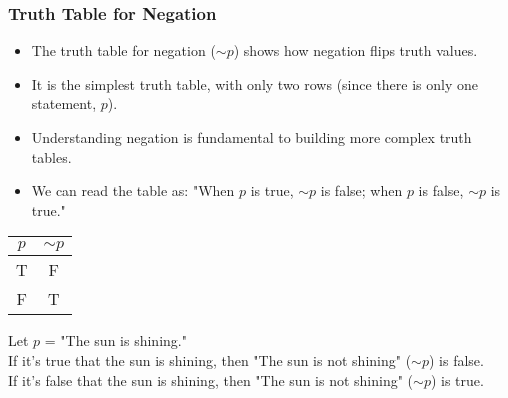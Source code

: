 \documentclass{beamer}
\begin{document}
                \begin{frame}
                \frametitle{Truth Table for Negation}
                \begin{itemize}
                    \item The truth table for negation ($\sim p$) shows how negation flips truth values.
                    \item It is the simplest truth table, with only two rows (since there is only one statement, $p$).
                    \item Understanding negation is fundamental to building more complex truth tables.
                    \item We can read the table as: "When $p$ is true, $\sim p$ is false; when $p$ is false, $\sim p$ is true."
                \end{itemize}
                
                \begin{center}
                \begin{tabular}{|c|c|}
                \hline
                $p$ & $\sim p$ \\
                \hline
                T & F \\
                \hline
                F & T \\
                \hline
                \end{tabular}
                \end{center}
                
                \begin{example}
                    \scriptsize
                Let $p$ = "The sun is shining."\\
                If it's true that the sun is shining, then "The sun is not shining" ($\sim p$) is false.\\
                If it's false that the sun is shining, then "The sun is not shining" ($\sim p$) is true.
                \end{example}
                \end{frame}
\end{document}
